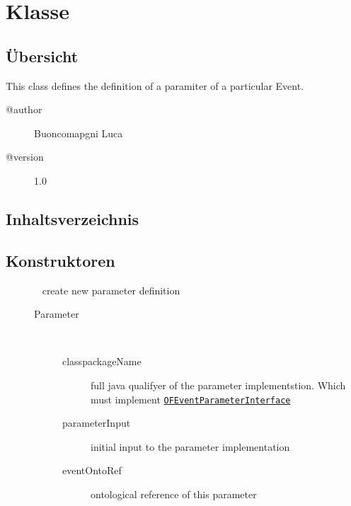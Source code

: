 
\section[OFEventParameterDefinition]{Klasse }\label{ontologyFramework.OFEventManagement.OFEventParameterDefinition-class}
\subsection{Übersicht}
This class defines the definition of a paramiter of a particular Event.
\begin{description}
\item[@author] 
Buoncomapgni Luca
\item[@version] 
1.0
\end{description}
\subsection{Inhaltsverzeichnis}
\subsection{Konstruktoren}
\begin{description}
\item[{\label{ontologyFramework.OFEventManagement.OFEventParameterDefinition(java.util.List<java.lang.String>,java.lang.Object,java.lang.String)}}]
~ create new parameter definition
\begin{description}
\item[Parameter] ~
\begin{description}
\item[classpackageName]
full java qualifyer of the parameter implementstion. Which must implement \texttt{\hyperlink{ontologyFramework.OFEventManagement.OFEventParameterInterface-class}{OFEventParameterInterface}}
\item[parameterInput]
initial input to the parameter implementation
\item[eventOntoRef]
ontological reference of this parameter
\end{description}
\end{description}
\end{description}
